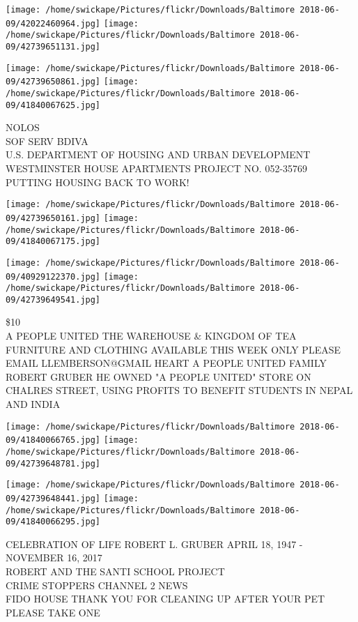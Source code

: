 \documentclass[10pt,letterpaper]{article}
\begin{document}
\texttt{[image: /home/swickape/Pictures/flickr/Downloads/Baltimore 2018-06-09/42022460964.jpg]}
\texttt{[image: /home/swickape/Pictures/flickr/Downloads/Baltimore 2018-06-09/42739651131.jpg]}

\texttt{[image: /home/swickape/Pictures/flickr/Downloads/Baltimore 2018-06-09/42739650861.jpg]}
\texttt{[image: /home/swickape/Pictures/flickr/Downloads/Baltimore 2018-06-09/41840067625.jpg]}

NOLOS\\
SOF SERV BDIVA\\
U.S. DEPARTMENT OF HOUSING AND URBAN DEVELOPMENT WESTMINSTER HOUSE APARTMENTS PROJECT NO. 052{-}35769\\
PUTTING HOUSING BACK TO WORK!
\pagebreak

\texttt{[image: /home/swickape/Pictures/flickr/Downloads/Baltimore 2018-06-09/42739650161.jpg]}
\texttt{[image: /home/swickape/Pictures/flickr/Downloads/Baltimore 2018-06-09/41840067175.jpg]}

\texttt{[image: /home/swickape/Pictures/flickr/Downloads/Baltimore 2018-06-09/40929122370.jpg]}
\texttt{[image: /home/swickape/Pictures/flickr/Downloads/Baltimore 2018-06-09/42739649541.jpg]}

\$10\\
A PEOPLE UNITED THE WAREHOUSE \& KINGDOM OF TEA\\
FURNITURE AND CLOTHING AVAILABLE THIS WEEK ONLY PLEASE EMAIL LLEMBERSON@GMAIL HEART A PEOPLE UNITED FAMILY\\
ROBERT GRUBER HE OWNED "A PEOPLE UNITED" STORE ON CHALRES STREET, USING PROFITS TO BENEFIT STUDENTS IN NEPAL AND INDIA
\pagebreak

\texttt{[image: /home/swickape/Pictures/flickr/Downloads/Baltimore 2018-06-09/41840066765.jpg]}
\texttt{[image: /home/swickape/Pictures/flickr/Downloads/Baltimore 2018-06-09/42739648781.jpg]}

\texttt{[image: /home/swickape/Pictures/flickr/Downloads/Baltimore 2018-06-09/42739648441.jpg]}
\texttt{[image: /home/swickape/Pictures/flickr/Downloads/Baltimore 2018-06-09/41840066295.jpg]}

CELEBRATION OF LIFE ROBERT L. GRUBER APRIL 18, 1947 {-} NOVEMBER 16, 2017\\
ROBERT AND THE SANTI SCHOOL PROJECT\\
CRIME STOPPERS CHANNEL 2 NEWS\\
FIDO HOUSE THANK YOU FOR CLEANING UP AFTER YOUR PET PLEASE TAKE ONE
\pagebreak
\end{document}

